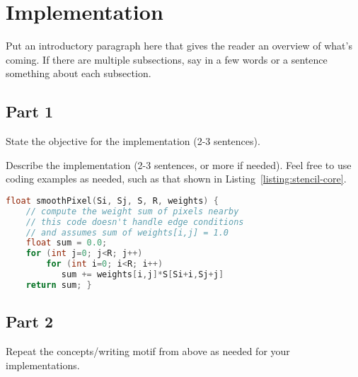 
\section{Implementation}
\label{sec:implementation}


Put an introductory paragraph here that gives the reader an overview of what's coming. If there are multiple subsections, say in a few words or a sentence something about each subsection.

\subsection{Part 1}

State  the objective for the implementation (2-3 sentences).

Describe the implementation (2-3 sentences, or more if needed). Feel free to use coding examples as needed, such as that shown in Listing~\ref{listing:stencil-core}.

\begin{lstlisting}[caption={Stencil computation in 2D: performs sum of product of nearby pixels with weights.},label={listing:stencil-core}, name=stencil-core, float=h, style=mystyle,language=C++]
float smoothPixel(Si, Sj, S, R, weights) {
    // compute the weight sum of pixels nearby
    // this code doesn't handle edge conditions
    // and assumes sum of weights[i,j] = 1.0 
    float sum = 0.0;
    for (int j=0; j<R; j++)
        for (int i=0; i<R; i++)
           sum += weights[i,j]*S[Si+i,Sj+j]
    return sum; }
\end{lstlisting}

\subsection{Part 2}

Repeat the concepts/writing motif from above as needed for your implementations.

